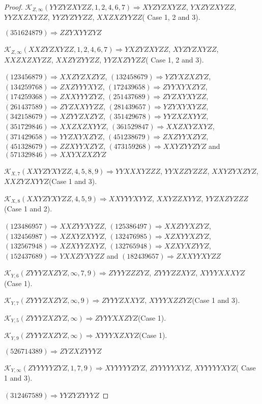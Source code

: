 \documentclass[12pt]{article}
\theoremstyle{plain}
\theoremstyle{definition}
\theoremstyle{remark}
\newcommand{\fancy}[1]{\mathcal{#1}}
\def\K{\fancy{K}}
\begin{document}
\begin{proof}
	
	$\K_{Z,\infty}(YYZYZXYZZ,1, 2, 4, 6, 7)\Rightarrow $$XYZYZXYZZ$, $YXZYZXYZZ$, $YYZXZXYZZ$, $YYZYZYYZZ$, $XXZXZYYZZ$( Case 1, 2 and 3).
	
	
	
	$(3 5 1 6 2 4 8 7 9)\Rightarrow ZZYXYYZYZ$
	
	
	$\K_{Z,\infty}(XXZYZXYZZ,1, 2, 4, 6, 7)\Rightarrow $$YXZYZXYZZ$, $XYZYZXYZZ$, $XXZXZXYZZ$, $XXZYZYYZZ$, $YYZXZYYZZ$( Case 1, 2 and 3).
	
	
	
	$(1 2 3 4 5 6 8 7 9)\Rightarrow XXZYZXZYZ$, $(1 3 2 4 5 8 6 7 9)\Rightarrow YZYXZXZYZ$, $(1 3 4 2 5 9 7 6 8)\Rightarrow ZXZYYYXYZ$, $(1 7 2 4 3 9 6 5 8)\Rightarrow ZYYXYXZYZ$, $(1 7 4 2 5 9 3 6 8)\Rightarrow ZXXYYYZYZ$, $(2 5 1 4 3 7 6 8 9)\Rightarrow ZYZXYXYZZ$, $(2 6 1 4 3 7 5 8 9)\Rightarrow ZYZXXYYZZ$, $(2 8 1 4 3 9 6 5 7)\Rightarrow YZYXYXYZZ$, $(3 4 2 1 5 8 6 7 9)\Rightarrow XZYYZXZYZ$, $(3 5 1 4 2 9 6 7 8)\Rightarrow YYZXZXYYZ$, $(3 5 1 7 2 9 8 4 6)\Rightarrow XXZXZXYYZ$, $(3 6 1 5 2 9 8 4 7)\Rightarrow XXZXYZXYZ$, $(3 7 1 4 2 9 6 5 8)\Rightarrow YYZXYXZYZ$, $(4 5 1 2 3 8 6 7 9)\Rightarrow ZXZYYXZYZ$, $(4 5 1 3 2 8 6 7 9)\Rightarrow ZZXYYXZYZ$, $(4 7 3 1 5 9 2 6 8)\Rightarrow XXYZYYZYZ$ and $(5 7 1 3 2 9 8 4 6)\Rightarrow XXYXZXZYZ$
	
	
	$\K_{X,7}(XXYZYXYZZ,4, 5, 8, 9)\Rightarrow $$YYXXXYZZZ$, $YYXZZYZZZ$, $XXYZYXZYZ$, $XXZYZXYYZ$(Case 1 and 3).
	
	$\K_{X,8}(XXYZYXYZZ,4, 5, 9)\Rightarrow $$XXYYYXYYZ$, $XXYZZXYYZ$, $YYZXZYZZZ$(Case 1 and 2).
	
	
	
	$(1 2 3 4 8 6 9 5 7)\Rightarrow XXZYYXYZZ$, $(1 2 5 3 8 6 4 9 7)\Rightarrow XXZYYXZYZ$, $(1 3 2 4 5 6 9 8 7)\Rightarrow XZXYZXYYZ$, $(1 3 2 4 7 6 9 8 5)\Rightarrow XZXYYXZYZ$, $(1 3 2 5 6 7 9 4 8)\Rightarrow XZXYYZXYZ$, $(1 3 2 7 6 5 9 4 8)\Rightarrow XZXYXZYYZ$, $(1 5 2 4 3 7 6 8 9)\Rightarrow YXXZYXYZZ$ and $(1 8 2 4 3 9 6 5 7)\Rightarrow ZXXYYXYZZ$
	
	
	$\K_{Y,6}(ZYYYZXZYZ,\infty,7, 9)\Rightarrow $$ZYYYZZZYZ$, $ZYYYZZXYZ$, $XYYYXXXYZ$(Case 1).
	
	$\K_{Y,7}(ZYYYZXZYZ,\infty,9)\Rightarrow $$ZYYYZXXYZ$, $XYYYXZZYZ$(Case 1 and 3).
	
	$\K_{Y,5}(ZYYYZXZYZ,\infty)\Rightarrow $$ZYYYXXZYZ$(Case 1).
	
	$\K_{Y,9}(ZYYYZXZYZ,\infty)\Rightarrow $$XYYYXZXYZ$(Case 1).
	
	
	
	$(5 2 6 7 1 4 3 8 9)\Rightarrow ZYZXZYYYZ$
	
	
	$\K_{Y,\infty}(ZYYYYYZYZ,1, 7, 9)\Rightarrow $$XYYYYYZYZ$, $ZYYYYYXYZ$, $XYYYYYXYZ$( Case 1 and 3).
	
	
	
	$(3 1 2 4 6 7 5 8 9)\Rightarrow YYZYZYYYZ$
	
	
	
\end{proof}
\end{document}
